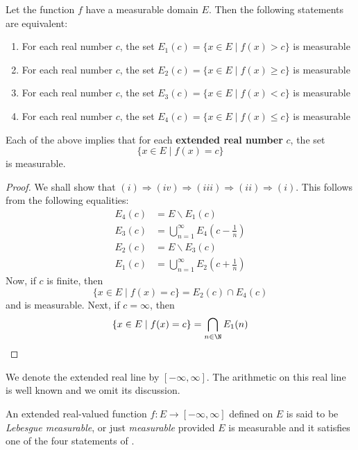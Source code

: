 \begin{theorem}
    Let the function $f$ have a measurable domain $E$. Then the following statements are equivalent: 
    \begin{enumerate}[label=(\roman*)]
        \item For each real number $c$, the set $E_1(c) = \{x\in E\mid f(x) > c\}$ is measurable 
        \item For each real number $c$, the set $E_2(c) = \{x\in E\mid f(x)\ge c\}$ is measurable 
        \item For each real number $c$, the set $E_3(c) = \{x\in E\mid f(x) < c\}$ is measurable 
        \item For each real number $c$, the set $E_4(c) = \{x\in E\mid f(x)\le c\}$ is measurable
    \end{enumerate}
    Each of the above implies that for each \textbf{extended real number} $c$, the set 
    \begin{equation*}
        \{x\in E\mid f(x) = c\}
    \end{equation*}
    is measurable.
\end{theorem}
\begin{proof}
We shall show that $(i)\Longrightarrow(iv)\Longrightarrow(iii)\Longrightarrow(ii)\Longrightarrow(i)$. This follows from the following equalities: 
\begin{align*}
    E_4(c) &= E\backslash E_1(c)\\
    E_3(c) &= \bigcup_{n = 1}^\infty E_4\left(c - \frac{1}{n}\right)\\
    E_2(c) &= E\backslash E_3(c)\\
    E_1(c) &= \bigcup_{n = 1}^\infty E_2\left(c + \frac{1}{n}\right)
\end{align*}
Now, if $c$ is finite, then 
\begin{equation*}
    \{x\in E\mid f(x) = c\} = E_2(c)\cap E_4(c)
\end{equation*}
and is measurable. Next, if $c = \infty$, then 
\begin{equation*}
    \{x\in E\mid f(x) = c\} = \bigcap_{n\in\N} E_1(n)
\end{equation*}
\end{proof}

We denote the extended real line by $[-\infty,\infty]$. The arithmetic on this real line is well known and we omit its discussion.

\begin{definition}
    An extended real-valued function $f: E\to[-\infty,\infty]$ defined on $E$ is said to be \textit{Lebesgue measurable}, or just \textit{measurable} provided $E$ is measurable and it satisfies one of the four statements of .
\end{definition}

